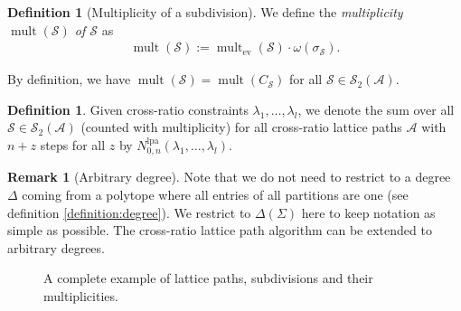 \documentclass[11pt,reqno,a4]{amsart}
\theoremstyle{dotless}
\theoremstyle{definition}
\newtheorem{definition}[corollary]{Definition}
\newtheorem{remark}[corollary]{Remark}
\newcommand{\mult}{\operatorname{mult}}
\newcommand{\ev}{\operatorname{ev}}
\begin{document}
\begin{definition}[Multiplicity of a subdivision]
We define the \textit{multiplicity $\mult(\mathcal{S})$ of $\mathcal{S}$} as
\begin{align*}
\mult(\mathcal{S}):=\mult_{\ev}(\mathcal{S})\cdot \omega (\sigma_\mathcal{S}).
\end{align*}
\end{definition}


By definition, we have $\mult(\mathcal{S}) = \mult(C_\mathcal{S})$ for all $\mathcal{S}\in\mathcal{S}_2(\mathcal{A})$.



\begin{definition}\label{definition:number_lpa}
Given cross-ratio constraints $\lambda_1,\dots,\lambda_l$, we denote the sum over all $\mathcal{S}\in\mathcal{S}_2(\mathcal{A})$ (counted with multiplicity) for all cross-ratio lattice paths $\mathcal{A}$ with $n+z$ steps for all $z$ by $N_{0,n}^{\textrm{lpa}}\left(\lambda_1,\dots,\lambda_l\right)$.
\end{definition}


\begin{remark}[Arbitrary degree]
Note that we do not need to restrict to a degree $\Delta$ coming from a polytope where all entries of all partitions are one (see definition \ref{definition:degree}). We restrict to $\Delta(\Sigma)$ here to keep notation as simple as possible. The cross-ratio lattice path algorithm can be extended to arbitrary degrees.
\end{remark}

\begin{figure}[H]
\centering
\def\svgwidth{380pt}

\caption{A complete example of lattice paths, subdivisions and their multiplicities.}
\label{Example_complete_lattice_path}
\end{figure}
\end{document}
